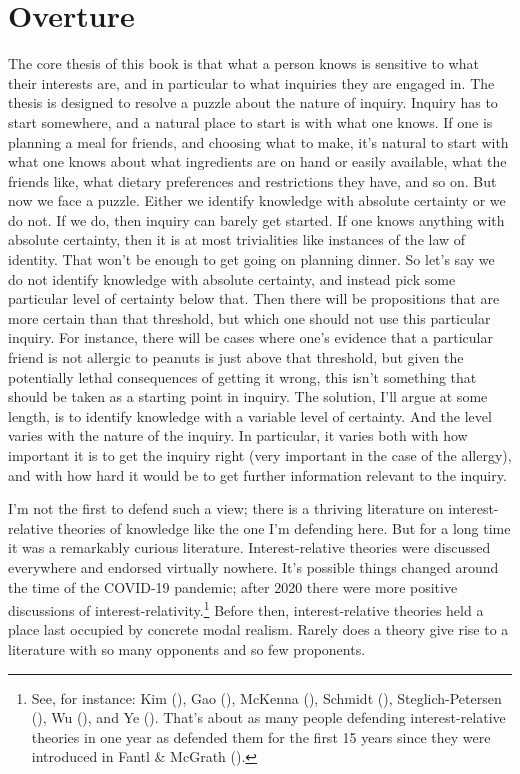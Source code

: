 \documentclass[
  12pt,
  letterpaper,
]{scrbook}
\begin{document}

\chapter{Overture}\label{sec-overture}

The core thesis of this book is that what a person knows is sensitive to
what their interests are, and in particular to what inquiries they are
engaged in. The thesis is designed to resolve a puzzle about the nature
of inquiry. Inquiry has to start somewhere, and a natural place to start
is with what one knows. If one is planning a meal for friends, and
choosing what to make, it's natural to start with what one knows about
what ingredients are on hand or easily available, what the friends like,
what dietary preferences and restrictions they have, and so on. But now
we face a puzzle. Either we identify knowledge with absolute certainty
or we do not. If we do, then inquiry can barely get started. If one
knows anything with absolute certainty, then it is at most trivialities
like instances of the law of identity. That won't be enough to get going
on planning dinner. So let's say we do not identify knowledge with
absolute certainty, and instead pick some particular level of certainty
below that. Then there will be propositions that are more certain than
that threshold, but which one should not use this particular inquiry.
For instance, there will be cases where one's evidence that a particular
friend is not allergic to peanuts is just above that threshold, but
given the potentially lethal consequences of getting it wrong, this
isn't something that should be taken as a starting point in inquiry. The
solution, I'll argue at some length, is to identify knowledge with a
variable level of certainty. And the level varies with the nature of the
inquiry. In particular, it varies both with how important it is to get
the inquiry right (very important in the case of the allergy), and with
how hard it would be to get further information relevant to the inquiry.

I'm not the first to defend such a view; there is a thriving literature
on interest-relative theories of knowledge like the one I'm defending
here. But for a long time it was a remarkably curious literature.
Interest-relative theories were discussed everywhere and endorsed
virtually nowhere. It's possible things changed around the time of the
COVID-19 pandemic; after 2020 there were more positive discussions of
interest-relativity.\footnote{See, for instance: Kim
  (), Gao (),
  McKenna (), Schmidt
  (), Steglich-Petersen
  (), Wu
  (), and Ye
  (). That's about as many people
  defending interest-relative theories in one year as defended them for
  the first 15 years since they were introduced in Fantl \& McGrath
  ().} Before then,
interest-relative theories held a place last occupied by concrete modal
realism. Rarely does a theory give rise to a literature with so many
opponents and so few proponents.
\end{document}
